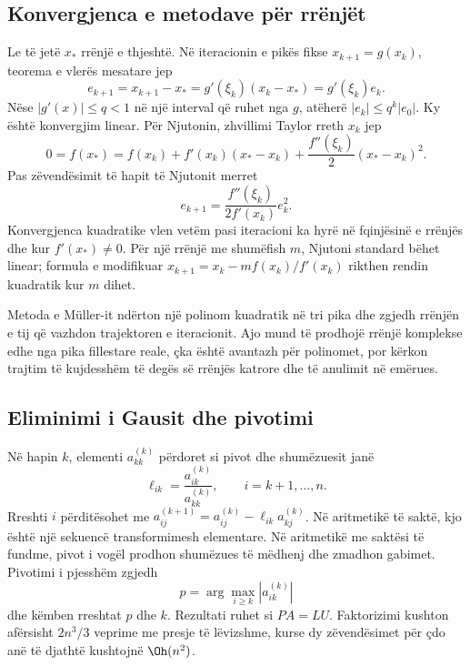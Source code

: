 \subsection{Konvergjenca e metodave për rrënjët}
Le të jetë $x_*$ rrënjë e thjeshtë. Në iteracionin e pikës fikse $x_{k+1}=g(x_k)$, teorema e vlerës mesatare jep
\begin{equation}
 e_{k+1}=x_{k+1}-x_*=g'(\xi_k)(x_k-x_*)=g'(\xi_k)e_k.
\end{equation}
Nëse $|g'(x)|\le q<1$ në një interval që ruhet nga $g$, atëherë $|e_k|\le q^k|e_0|$. Ky është konvergjim linear. Për Njutonin, zhvillimi Taylor rreth $x_k$ jep
\begin{equation}
 0=f(x_*)=f(x_k)+f'(x_k)(x_*-x_k)+\frac{f''(\xi_k)}{2}(x_*-x_k)^2.
\end{equation}
Pas zëvendësimit të hapit të Njutonit merret
\begin{equation}
 e_{k+1}=\frac{f''(\xi_k)}{2f'(x_k)}e_k^2.
\end{equation}
Konvergjenca kuadratike vlen vetëm pasi iteracioni ka hyrë në fqinjësinë e rrënjës dhe kur $f'(x_*)\ne0$. Për një rrënjë me shumëfish $m$, Njutoni standard bëhet linear; formula e modifikuar $x_{k+1}=x_k-mf(x_k)/f'(x_k)$ rikthen rendin kuadratik kur $m$ dihet.

Metoda e Müller-it ndërton një polinom kuadratik në tri pika dhe zgjedh rrënjën e tij që vazhdon trajektoren e iteracionit. Ajo mund të prodhojë rrënjë komplekse edhe nga pika fillestare reale, çka është avantazh për polinomet, por kërkon trajtim të kujdesshëm të degës së rrënjës katrore dhe të anulimit në emërues.

\subsection{Eliminimi i Gausit dhe pivotimi}
Në hapin $k$, elementi $a_{kk}^{(k)}$ përdoret si pivot dhe shumëzuesit janë
\begin{equation}
 \ell_{ik}=\frac{a_{ik}^{(k)}}{a_{kk}^{(k)}},\qquad i=k+1,\ldots,n.
\end{equation}
Rreshti $i$ përditësohet me $a_{ij}^{(k+1)}=a_{ij}^{(k)}-\ell_{ik}a_{kj}^{(k)}$. Në aritmetikë të saktë, kjo është një sekuencë transformimesh elementare. Në aritmetikë me saktësi të fundme, pivot i vogël prodhon shumëzues të mëdhenj dhe zmadhon gabimet. Pivotimi i pjesshëm zgjedh
\begin{equation}
 p=\arg\max_{i\ge k}|a_{ik}^{(k)}|
\end{equation}
dhe këmben rreshtat $p$ dhe $k$. Rezultati ruhet si $PA=LU$. Faktorizimi kushton afërsisht $2n^3/3$ veprime me presje të lëvizshme, kurse dy zëvendësimet për çdo anë të djathtë kushtojnë $\Oh(n^2)$.

